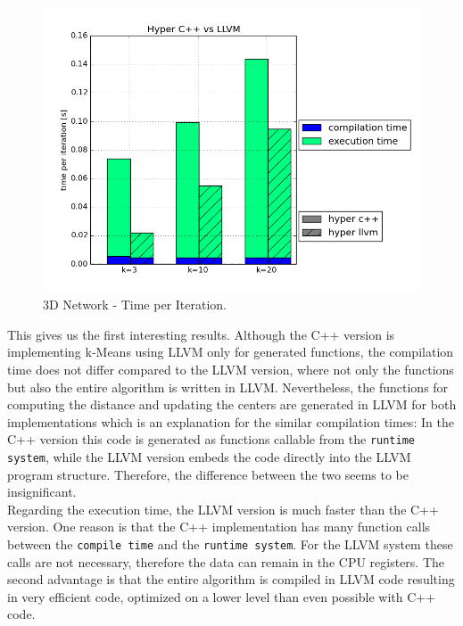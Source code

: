 \begin{figure}[htsb]
  \centering
  \includegraphics[scale=0.5, trim="0cm 1.5cm 0cm 0cm"]{figures/charts/hyper_network}
  \caption[3D Network - Time per Iteration]{3D Network - Time per Iteration.}
  \label{fig:hyper_network}
\end{figure}

This gives us the first interesting results. Although the C++ version is implementing k-Means using LLVM only for generated functions, the compilation time does not differ compared to the LLVM version, where not only the functions but also the entire algorithm is written in LLVM. Nevertheless, the functions for computing the distance and updating the centers are generated in LLVM for both implementations which is an explanation for the similar compilation times: In the C++ version this code is generated as functions callable from the \texttt{runtime system}, while the LLVM version embeds the code directly into the LLVM program structure. Therefore, the difference between the two seems to be insignificant.
\\
Regarding the execution time, the LLVM version is much faster than the C++ version. One reason is that the C++ implementation has many function calls between the \texttt{compile time} and the \texttt{runtime system}. For the LLVM system these calls are not necessary, therefore the data can remain in the CPU registers. The second advantage is that the entire algorithm is compiled in LLVM code resulting in very efficient code, optimized on a lower level than even possible with C++ code.


